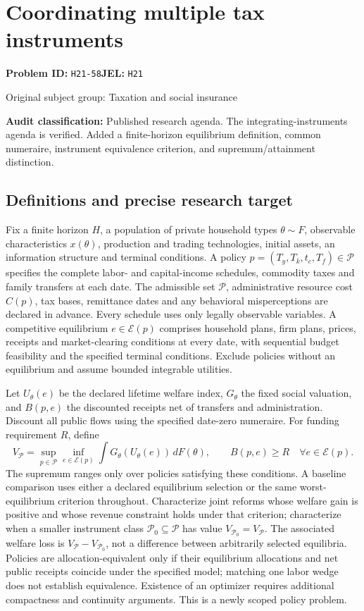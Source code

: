 \documentclass[11pt,a4paper]{article}
\begin{document}
\section*{Coordinating multiple tax instruments}
\textbf{Problem ID:} \texttt{H21-58}\quad \textbf{JEL:} \texttt{H21}\par
\label{problem:OP-0471}
{\sffamily\small\color{muted}Original subject group: Taxation and social insurance\par}
\label{definitions:problem:30007753}
\textbf{Audit classification:} Published research agenda. The integrating-instruments agenda is verified. Added a finite-horizon equilibrium definition, common numeraire, instrument equivalence criterion, and supremum/attainment distinction.
\subsection*{Definitions and precise research target}
Fix a finite horizon \(H\), a population of private household types \(\theta\sim F\), observable characteristics \(x(\theta)\), production and trading technologies, initial assets, an information structure and terminal conditions. A policy \(p=(T_y,T_k,t_c,T_f)\in\mathcal P\) specifies the complete labor- and capital-income schedules, commodity taxes and family transfers at each date. The admissible set \(\mathcal P\), administrative resource cost \(C(p)\), tax bases, remittance dates and any behavioral misperceptions are declared in advance. Every schedule uses only legally observable variables. A competitive equilibrium \(e\in\mathcal E(p)\) comprises household plans, firm plans, prices, receipts and market-clearing conditions at every date, with sequential budget feasibility and the specified terminal conditions. Exclude policies without an equilibrium and assume bounded integrable utilities.

Let \(U_\theta(e)\) be the declared lifetime welfare index, \(G_\theta\) the fixed social valuation, and \(B(p,e)\) the discounted receipts net of transfers and administration. Discount all public flows using the specified date-zero numeraire. For funding requirement \(R\), define
\[
 V_{\mathcal P}=\sup_{p\in\mathcal P}\inf_{e\in\mathcal E(p)}\int G_\theta(U_\theta(e))\,dF(\theta),
 \qquad B(p,e)\geq R\quad\forall e\in\mathcal E(p).
\]
The supremum ranges only over policies satisfying these conditions. A baseline comparison uses either a declared equilibrium selection or the same worst-equilibrium criterion throughout. Characterize joint reforms whose welfare gain is positive and whose revenue constraint holds under that criterion; characterize when a smaller instrument class \(\mathcal P_0\subseteq\mathcal P\) has value \(V_{\mathcal P_0}=V_{\mathcal P}\). The associated welfare loss is \(V_{\mathcal P}-V_{\mathcal P_0}\), not a difference between arbitrarily selected equilibria. Policies are allocation-equivalent only if their equilibrium allocations and net public receipts coincide under the specified model; matching one labor wedge does not establish equivalence. Existence of an optimizer requires additional compactness and continuity arguments. This is a newly scoped policy problem.
\end{document}
